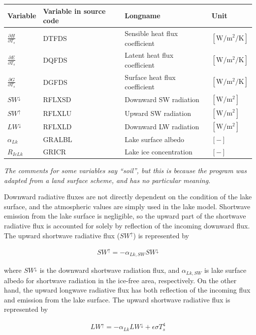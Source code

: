 \begin{longtable}[]{@{}llll@{}}
\toprule
Variable & Variable in source code & Longname & Unit \\
\midrule
\endhead
\(\frac{\partial H}{\partial T_s}\) & DTFDS & Sensible heat flux coefficient & \(\mathrm{[W/m^2/K]}\) \\
\(\frac{\partial E}{\partial T_s}\) & DQFDS & Latent heat flux coefficient & \(\mathrm{[W/m^2/K]}\) \\
\(\frac{\partial G}{\partial T_s}\) & DGFDS & Surface heat flux coefficient & \(\mathrm{[W/m^2/K]}\) \\
\(SW^\downarrow\) & RFLXSD & Downward SW radiation & \(\mathrm{[W/m^2]}\) \\
\(SW^\uparrow\) & RFLXLU & Upward SW radiation & \(\mathrm{[W/m^2]}\) \\
\(LW^\downarrow\) & RFLXLD & Downward LW radiation & \(\mathrm{[W/m^2]}\) \\
\(\alpha_{Lk}\) & GRALBL & Lake surface albedo & \(\mathrm{[-]}\) \\
\(R_{IcLk}\) & GRICR & Lake ice concentration & \(\mathrm{[-]}\) \\
\bottomrule
\end{longtable}

\emph{The comments for some variables say ``soil'', but this is because the program was adapted from a land surface scheme, and has no particular meaning.}

Downward radiative fluxes are not directly dependent on the condition of the lake surface, and the atmospheric values are simply used in the lake model. Shortwave emission from the lake surface is
negligible, so the upward part of the shortwave radiative flux is accounted for solely by reflection of the incoming downward flux. The upward shortwave radiative flux (\(SW^\uparrow\)) is represented
by

\begin{eqnarray}
    SW^\uparrow = - \alpha_{Lk,SW} SW^\downarrow
\end{eqnarray}

where \(SW^\downarrow\) is the downward shortwave radiation flux, and \(\alpha_{Lk,SW}\) is lake surface albedo for shortwave radiation in the ice-free area, respectively. On the other hand, the
upward longwave radiative flux has both reflection of the incoming flux and emission from the lake surface. The upward shortwave radiative flux is represented by

\begin{eqnarray}
    LW^\uparrow = - \alpha_{Lk} LW^\downarrow + \epsilon \sigma T_s ^4
\end{eqnarray}

